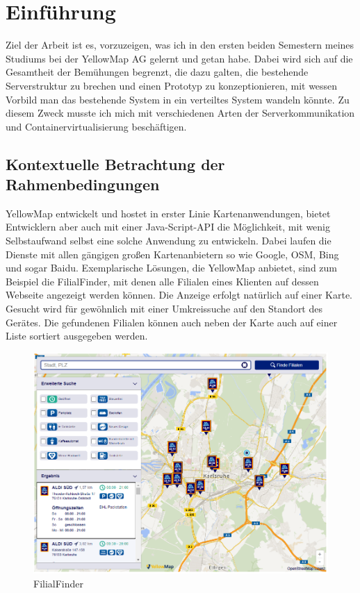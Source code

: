 \documentclass[12pt,a4paper]{scrartcl}
\begin{document}
\section{Einführung}
Ziel der Arbeit ist es, vorzuzeigen, was ich in den ersten beiden Semestern meines Studiums bei der YellowMap AG gelernt und getan habe. Dabei wird sich auf die Gesamtheit der Bemühungen begrenzt, die dazu galten, die bestehende Serverstruktur zu brechen und einen Prototyp zu konzeptionieren, mit wessen Vorbild man das bestehende System in ein verteiltes System wandeln könnte. Zu diesem Zweck musste ich mich mit verschiedenen Arten der Serverkommunikation und Containervirtualisierung beschäftigen.

\subsection{Kontextuelle Betrachtung der Rahmenbedingungen}

YellowMap entwickelt und hostet in erster Linie Kartenanwendungen, bietet Entwicklern aber auch mit einer Java-Script-API die Möglichkeit, mit wenig Selbstaufwand selbst eine solche Anwendung zu entwickeln. Dabei laufen die Dienste mit allen gängigen großen Kartenanbietern so wie Google, OSM, Bing und sogar Baidu. Exemplarische Lösungen, die YellowMap anbietet, sind zum Beispiel die FilialFinder, mit denen alle Filialen eines Klienten auf dessen Webseite angezeigt werden können. Die Anzeige erfolgt natürlich auf einer Karte. Gesucht wird für gewöhnlich mit einer Umkreissuche auf den Standort des Gerätes. Die gefundenen Filialen können auch neben der Karte auch auf einer Liste sortiert ausgegeben werden.

\begin{figure}[h!]
	\centering
	\includegraphics[scale=0.55]{YmFF.png}
	\caption[https://www.aldi-sued.de/filialen/ (Stand 28.08.2020)]{FilialFinder}
\end{figure}
\end{document}
